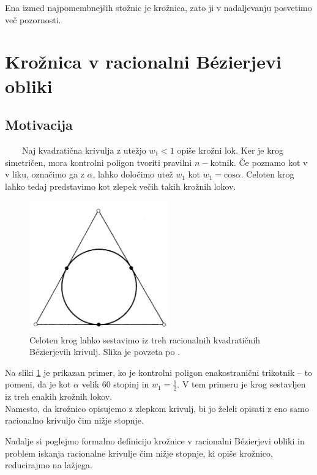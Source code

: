 \documentclass[a4paper,11pt]{article}
\theoremstyle{definition}
\theoremstyle{plain}
\begin{document}
Ena izmed najpomembnejših stožnic je krožnica, zato ji v nadaljevanju posvetimo več pozornosti.



\section{Krožnica v racionalni B\'ezierjevi obliki}

\subsection{Motivacija}
\ \ \ \
Naj kvadratična krivulja z utežjo $w_1 < 1$ opiše krožni lok. Ker je krog simetričen, mora kontrolni poligon tvoriti pravilni $n-$kotnik.
Če poznamo kot v v liku, označimo ga z $\alpha$, lahko določimo utež $w_1$ kot $w_1 = \text{cos} \alpha$.
Celoten krog lahko tedaj predstavimo kot zlepek večih takih krožnih lokov. 

\begin{figure}[ht!]
    \centering
    \includegraphics[width=60mm]{krog_po_delih.png}
    \caption{Celoten krog lahko sestavimo iz treh racionalnih kvadratičnih B\'ezierjevih krivulj. Slika je povzeta po \cite{farin}.}
    \label{slika:krogpodelih}
\end{figure}
\noindent
Na sliki \ref{slika:krogpodelih} je prikazan primer, ko je kontrolni poligon enakostranični trikotnik -- to pomeni, da je kot $\alpha$ velik 60 stopinj in $w_1 = \frac{1}{2}$. V tem primeru je krog sestavljen iz treh enakih krožnih lokov.
\\

Namesto, da krožnico opisujemo z zlepkom krivulj, bi jo želeli opisati z eno samo racionalno krivuljo čim nižje stopnje.

Nadalje si poglejmo formalno definicijo krožnice v racionalni B\'ezierjevi obliki in problem iskanja racionalne krivulje čim nižje stopnje, ki opiše krožnico, reducirajmo na lažjega.
\end{document}
